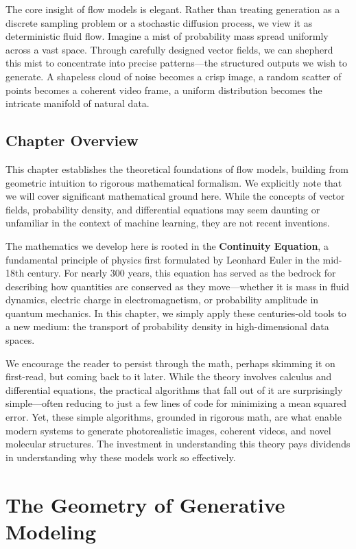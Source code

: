 \documentclass{book}
\begin{document}
The core insight of flow models is elegant. Rather than treating generation as a discrete sampling problem or a stochastic diffusion process, we view it as deterministic fluid flow. Imagine a mist of probability mass spread uniformly across a vast space. Through carefully designed vector fields, we can shepherd this mist to concentrate into precise patterns—the structured outputs we wish to generate. A shapeless cloud of noise becomes a crisp image, a random scatter of points becomes a coherent video frame, a uniform distribution becomes the intricate manifold of natural data.

\subsection{Chapter Overview}
This chapter establishes the theoretical foundations of flow models, building from geometric intuition to rigorous mathematical formalism. We explicitly note that we will cover significant mathematical ground here. While the concepts of vector fields, probability density, and differential equations may seem daunting or unfamiliar in the context of machine learning, they are not recent inventions.

The mathematics we develop here is rooted in the \textbf{Continuity Equation}, a fundamental principle of physics first formulated by Leonhard Euler in the mid-18th century. For nearly 300 years, this equation has served as the bedrock for describing how quantities are conserved as they move—whether it is mass in fluid dynamics, electric charge in electromagnetism, or probability amplitude in quantum mechanics. In this chapter, we simply apply these centuries-old tools to a new medium: the transport of probability density in high-dimensional data spaces.

We encourage the reader to persist through the math, perhaps skimming it on first-read, but coming back to it later. While the theory involves calculus and differential equations, the practical algorithms that fall out of it are surprisingly simple—often reducing to just a few lines of code for minimizing a mean squared error. Yet, these simple algorithms, grounded in rigorous math, are what enable modern systems to generate photorealistic images, coherent videos, and novel molecular structures. The investment in understanding this theory pays dividends in understanding why these models work so effectively.

\section{The Geometry of Generative Modeling}
\end{document}
